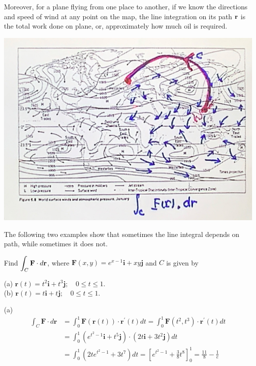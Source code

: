 \begin{spacing}{1.3}
    Moreover, for a plane flying from one place to another, if we know the directions and speed of wind
    at any point on the map, the line integration on its path ${\bf r}$ is the total work done on plane,
    or, approximately how much oil is required.
    \begin{center}
        \includegraphics[scale=0.14]{images/Ch15-plane-oil.JPG}
    \end{center}


    \newpage
    {\blue The following two examples show that sometimes the line integral depends on path,
    while sometimes it does not.}

    \eg Find $\displaystyle \int_{C} \mathbf{F} \cdot d \mathbf{r}$, where $\mathbf{F}(x, y)=e^{x-1} \mathbf{i}+x y \mathbf{j}$ 
    and $C$ is given by

    (a) $\mathbf{r}(t)=t^{2} \mathbf{i}+t^{3} \mathbf{j} ; \quad 0 \leqslant t \leqslant 1$.\\
    (b) $\mathbf{r}(t)=t \mathbf{i}+t \mathbf{j} ; \quad 0 \leqslant t \leqslant 1 .$

    \sol 

    (a)
    $$\begin{aligned}
    \int_{C} \mathbf{F} \cdot d \mathbf{r} &=\int_{0}^{1} \mathbf{F}(\mathbf{r}(t)) \cdot \mathbf{r}^{\prime}(t) d t=\int_{0}^{1} \mathbf{F}\left(t^{2}, t^{3}\right) \cdot \mathbf{r}^{\prime}(t) d t \\
    &=\int_{0}^{1}\left(e^{t^{2}-1} \mathbf{i}+t^{5} \mathbf{j}\right) \cdot\left(2 t \mathbf{i}+3 t^{2} \mathbf{j}\right) d t \\
    &=\int_{0}^{1}\left(2 t e^{t^{2}-1}+3 t^{7}\right) d t =\left[e^{t^{2}-1}+\frac{3}{8} t^{8}\right]_{0}^{1}=\frac{11}{8}-\frac{1}{e}
    \end{aligned}$$


\end{spacing}
